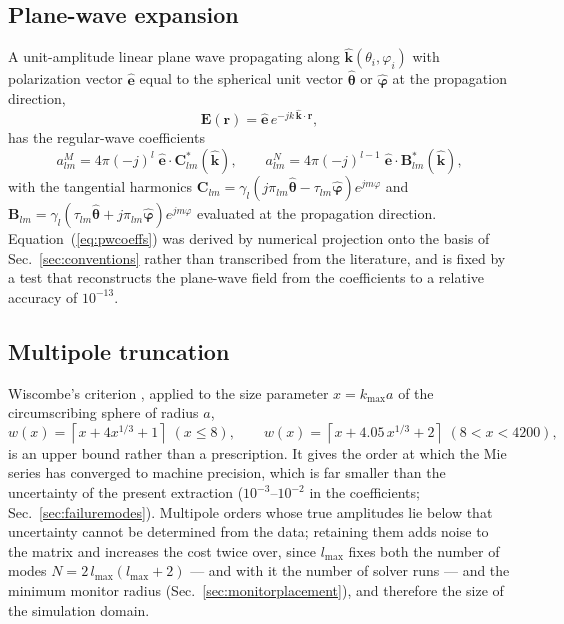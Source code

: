 \documentclass[11pt]{article}
\newcommand{\rr}{\mathbf{r}}
\newcommand{\EE}{\mathbf{E}}
\newcommand{\thhat}{\hat{\boldsymbol{\theta}}}
\newcommand{\phhat}{\hat{\boldsymbol{\varphi}}}
\newcommand{\khat}{\hat{\mathbf{k}}}
\newcommand{\ehat}{\hat{\mathbf{e}}}
\begin{document}
\subsection{Plane-wave expansion}
A unit-amplitude linear plane wave propagating along
$\khat(\theta_i,\varphi_i)$ with polarization vector $\ehat$ equal to the
spherical unit vector $\thhat$ or $\phhat$ at the propagation direction,
\begin{equation}
\EE(\rr) = \ehat\, e^{-jk\,\khat\cdot\rr},
\end{equation}
has the regular-wave coefficients
\begin{equation}
a^M_{lm} = 4\pi(-j)^l\; \ehat\cdot\mathbf{C}^*_{lm}(\khat),
\qquad
a^N_{lm} = 4\pi(-j)^{l-1}\; \ehat\cdot\mathbf{B}^*_{lm}(\khat),
\label{eq:pwcoeffs}
\end{equation}
with the tangential harmonics
$\mathbf{C}_{lm} = \gamma_l (j\pi_{lm}\thhat - \tau_{lm}\phhat)
 e^{jm\varphi}$ and
$\mathbf{B}_{lm} = \gamma_l (\tau_{lm}\thhat + j\pi_{lm}\phhat)
 e^{jm\varphi}$ evaluated at the propagation direction.
Equation~(\ref{eq:pwcoeffs}) was derived by numerical projection onto the
basis of Sec.~\ref{sec:conventions} rather than transcribed from the
literature, and is fixed by a test that reconstructs the plane-wave field
from the coefficients to a relative accuracy of $10^{-13}$.

\subsection{Multipole truncation}
\label{sec:truncation}
Wiscombe's criterion \cite{Wiscombe1980}, applied to the size parameter
$x = k_{\max} a$ of the circumscribing sphere of radius $a$,
\begin{equation}
w(x) = \left\lceil x + 4x^{1/3} + 1 \right\rceil \;(x\le 8),
\qquad
w(x) = \left\lceil x + 4.05\,x^{1/3} + 2 \right\rceil \;(8<x<4200),
\label{eq:wiscombe}
\end{equation}
is an upper bound rather than a prescription.  It gives the order at
which the Mie series has converged to machine precision, which is far
smaller than the uncertainty of the present extraction
($10^{-3}$--$10^{-2}$ in the coefficients;
Sec.~\ref{sec:failuremodes}).  Multipole orders whose true amplitudes
lie below that uncertainty cannot be determined from the data; retaining
them adds noise to the matrix and increases the cost twice over, since
$l_{\max}$ fixes both the number of modes
$N = 2\,l_{\max}(l_{\max}+2)$ --- and with it the number of solver runs
--- and the minimum monitor radius (Sec.~\ref{sec:monitorplacement}),
and therefore the size of the simulation domain.
\end{document}
